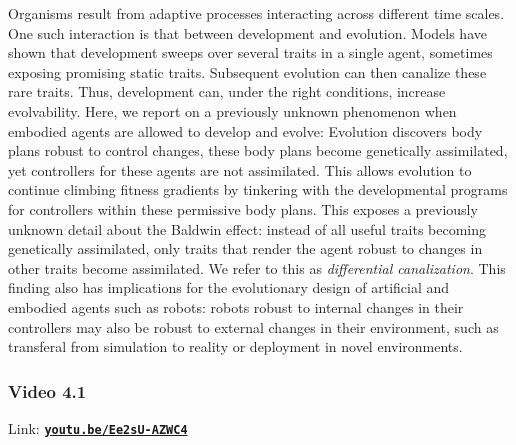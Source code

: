 
\noindent
Organisms result from adaptive processes interacting across different time scales. 
One such interaction is that between development and evolution. 
Models have shown that development sweeps over several traits in a single agent, sometimes exposing promising static traits. 
Subsequent evolution can then canalize these rare traits. 
Thus, development can, under the right conditions, increase evolvability. 
Here, we report on a previously unknown phenomenon when embodied agents are allowed to develop and evolve: Evolution discovers body plans robust to control changes, these body plans become genetically assimilated, yet controllers for these agents are not assimilated. 
This allows evolution to continue climbing fitness gradients by tinkering with the developmental programs for controllers within these permissive body plans. 
This exposes a previously unknown detail about the Baldwin effect: instead of all useful traits becoming genetically assimilated, only traits that render the agent robust to changes in other traits become assimilated. 
We refer to this as \textit{differential canalization}.
This finding also has implications for the evolutionary design of artificial and embodied agents such as robots: robots robust to internal changes in their controllers may also be robust to external changes in their environment, such as transferal from simulation to reality or deployment in novel environments.



\subsubsection*{Video 4.1}
Link:
\href{https://youtu.be/Ee2sU-AZWC4}{\textbf{\texttt{youtu.be/Ee2sU-AZWC4}}}